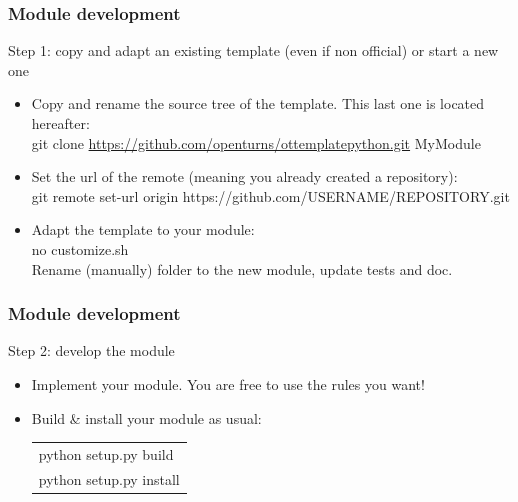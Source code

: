\documentclass[8pt]{beamer}
\begin{document}
\begin{frame}
  \frametitle{Module development}
  \begin{block}{Step 1: copy and adapt an existing template (even if non official) or start a new one}
    \begin{itemize}
    \item Copy and rename the source tree of the template. This last one is located hereafter: \\
      {\ttfamily git clone \href{https://github.com/openturns/ottemplatepython.git}{https://github.com/openturns/ottemplatepython.git} MyModule}
    \item Set the url of the remote (meaning you already created a repository):\\
      {\ttfamily git remote set-url origin https://github.com/USERNAME/REPOSITORY.git}
    \item Adapt the template to your module:\\
      {\ttfamily no customize.sh }\\
      Rename (manually) folder to the new module, update tests and doc.
    \end{itemize}
  \end{block}
\end{frame}

\begin{frame}
  \frametitle{Module development}
  \begin{block}{Step 2: develop the module}
    \begin{itemize}
    \item Implement your module. You are free to use the rules you want!
    \item Build \& install your module as usual:
      \begin{tabular}{l}
        \ttfamily python setup.py build \\
        \ttfamily python setup.py install
      \end{tabular}
    \end{itemize}
  \end{block}
\end{frame}
\end{document}
